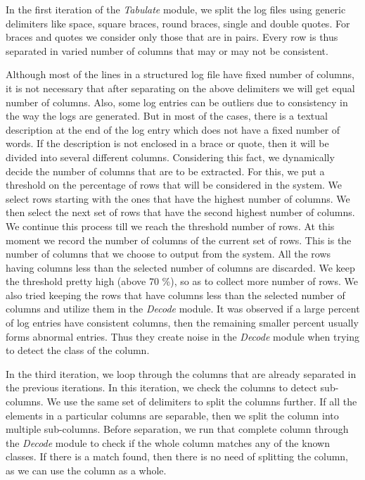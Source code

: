 In the first iteration of the \textit{Tabulate} module, we split the log files using generic delimiters like space, square braces, round braces, single and double quotes. For braces and quotes we consider only those that are in pairs. Every row is thus separated in varied number of columns that may or may not be consistent. 

Although most of the lines in a structured log file have fixed number of columns, it is not necessary that after separating on the above delimiters we will get equal number of columns. Also, some log entries can be outliers due to consistency in the way the logs are generated. But in most of the cases, there is a textual description at the end of the log entry which does not have a fixed number of words. If the description is not enclosed in a brace or quote, then it will be divided into several different columns. Considering this fact, we dynamically decide the number of columns that are to be extracted. For this, we put a threshold on the percentage of rows that will be considered in the system. We select rows starting with the ones that have the highest number of columns. We then select the next set of rows that have the second highest number of columns. We continue this process till we reach the threshold number of rows. At this moment we record the number of columns of the current set of rows. This is the number of columns that we choose to output from the system. All the rows having columns less than the selected number of columns are discarded. We keep the threshold pretty high (above 70 \%), so as to collect more number of rows. We also tried keeping the rows that have columns less than the selected number of columns and utilize them in the \textit{Decode} module. It was observed if a large percent of log entries have consistent columns, then the remaining smaller percent usually forms abnormal entries. Thus they create noise in the \textit{Decode} module when trying to detect the class of the column.

In the third iteration, we loop through the columns that are already separated in the previous iterations. In this iteration, we check the columns to detect sub-columns. We use the same set of delimiters to split the columns further. If all the elements in a particular columns are separable, then we split the column into multiple sub-columns. Before separation, we run that complete column through the \textit{Decode} module to check if the whole column matches any of the known classes. If there is a match found, then there is no need of splitting the column, as we can use the column as a whole.



